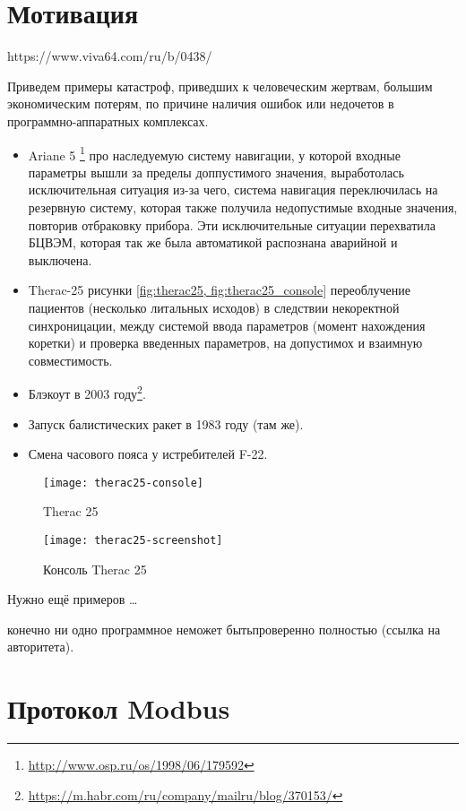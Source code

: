 \chapter{Мотивация}

https://www.viva64.com/ru/b/0438/



Приведем примеры катастроф, приведших к человеческим жертвам, большим экономическим потерям,
по причине наличия ошибок или недочетов в программно-аппаратных комплексах.
\begin{itemize}
    \item Ariane 5 \cite{journal:open_system:1998_adjaev}\footnote{\url{http://www.osp.ru/os/1998/06/179592}}
    про наследуемую систему навигации,
    у которой входные параметры вышли за пределы доппустимого значения,
    выработолась исключительная ситуация из-за чего, система навигация переключилась на резервную систему,
    которая также получила недопустимые входные значения, повторив отбраковку прибора.
    Эти исключительные ситуации перехватила БЦВЭМ, которая так же была автоматикой 
    распознана аварийной и выключена.
    \item Therac-25 \cite{journal:computer:1993:therac25} рисунки \ref{fig:therac25, fig:therac25_console} переоблучение пациентов (несколько литальных исходов) в следствии некоректной синхроницации,
    между системой ввода параметров (момент нахождения коретки) и проверка введенных параметров,
    на допустимох и взаимную совместимость.
    \item Блэкоут в 2003 году\footnote{\url{https://m.habr.com/ru/company/mailru/blog/370153/}}.
    \item Запуск балистических ракет в 1983 году (там же).
    \item Смена часового пояса у истребителей F-22. 
\end{itemize}

\begin{figure}
    \texttt{[image: therac25-console]}
    \caption{Therac 25}\label{fig:therac25}
    \texttt{[image: therac25-screenshot]}
    \caption{Консоль Therac 25}\label{fig:therac25_console}
\end{figure}

Нужно ещё примеров \ldots

конечно ни одно программное неможет бытьпроверенно полностью (ссылка на авторитета).

\chapter{Протокол Modbus}\label{ch:ch1}

